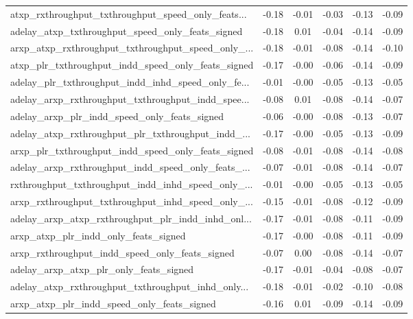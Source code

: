\begin{tabular}{|l|*{4}{c}|r|}
atxp\_rxthroughput\_txthroughput\_speed\_only\_feats... & -0.18 & -0.01 &   -0.03 &      -0.13 & -0.09 \\
adelay\_atxp\_txthroughput\_speed\_only\_feats\_signed   & -0.18 &  0.01 &   -0.04 &      -0.14 & -0.09 \\
arxp\_atxp\_rxthroughput\_txthroughput\_speed\_only\_... & -0.18 & -0.01 &   -0.08 &      -0.14 & -0.10 \\
atxp\_plr\_txthroughput\_indd\_speed\_only\_feats\_signed & -0.17 & -0.00 &   -0.06 &      -0.14 & -0.09 \\
adelay\_plr\_txthroughput\_indd\_inhd\_speed\_only\_fe... & -0.01 & -0.00 &   -0.05 &      -0.13 & -0.05 \\
adelay\_arxp\_rxthroughput\_txthroughput\_indd\_spee... & -0.08 &  0.01 &   -0.08 &      -0.14 & -0.07 \\
adelay\_arxp\_plr\_indd\_speed\_only\_feats\_signed       & -0.06 & -0.00 &   -0.08 &      -0.13 & -0.07 \\
adelay\_atxp\_rxthroughput\_plr\_txthroughput\_indd\_... & -0.17 & -0.00 &   -0.05 &      -0.13 & -0.09 \\
arxp\_plr\_txthroughput\_indd\_speed\_only\_feats\_signed & -0.08 & -0.01 &   -0.08 &      -0.14 & -0.08 \\
adelay\_arxp\_rxthroughput\_indd\_speed\_only\_feats\_... & -0.07 & -0.01 &   -0.08 &      -0.14 & -0.07 \\
rxthroughput\_txthroughput\_indd\_inhd\_speed\_only\_... & -0.01 & -0.00 &   -0.05 &      -0.13 & -0.05 \\
arxp\_rxthroughput\_txthroughput\_inhd\_speed\_only\_... & -0.15 & -0.01 &   -0.08 &      -0.12 & -0.09 \\
adelay\_arxp\_atxp\_rxthroughput\_plr\_indd\_inhd\_onl... & -0.17 & -0.01 &   -0.08 &      -0.11 & -0.09 \\
arxp\_atxp\_plr\_indd\_only\_feats\_signed               & -0.17 & -0.00 &   -0.08 &      -0.11 & -0.09 \\
arxp\_rxthroughput\_indd\_speed\_only\_feats\_signed     & -0.07 &  0.00 &   -0.08 &      -0.14 & -0.07 \\
adelay\_arxp\_atxp\_plr\_only\_feats\_signed             & -0.17 & -0.01 &   -0.04 &      -0.08 & -0.07 \\
adelay\_atxp\_rxthroughput\_txthroughput\_inhd\_only... & -0.18 & -0.01 &   -0.02 &      -0.10 & -0.08 \\
arxp\_atxp\_plr\_indd\_speed\_only\_feats\_signed         & -0.16 &  0.01 &   -0.09 &      -0.14 & -0.09 \\

\end{tabular}
